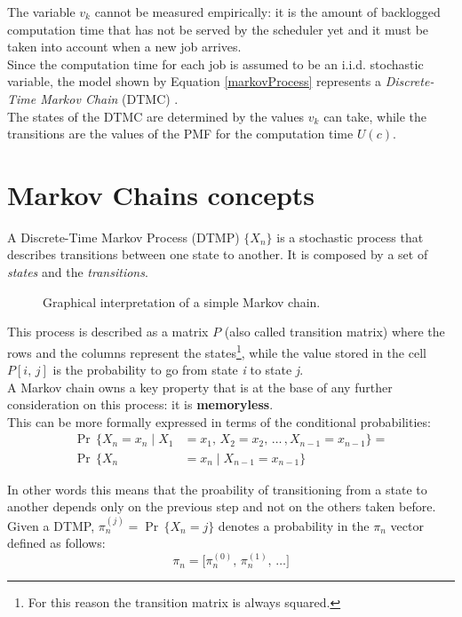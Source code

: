 The variable \( v_{k} \) cannot be measured empirically: it is the amount of backlogged computation time that has not be served by the scheduler yet and it must be taken into account when a new job arrives.\\
Since the computation time for each job is assumed to be an i.i.d. stochastic variable, the model shown by Equation \ref{markovProcess} represents a \emph{Discrete-Time Markov Chain} (DTMC) \cite{effRobustGuarantees} \cite{probGuarantees}.\\
The states of the DTMC are determined by the values \( v_{k} \) can take, while the transitions are the values of the PMF for the computation time \( U(c) \).

\section{Markov Chains concepts}
A Discrete-Time Markov Process (DTMP) \( \{X_{n}\} \) is a stochastic process that describes transitions between one state to another. It is composed by a set of \emph{states} and the \emph{transitions}.
\begin{figure}[H]
  \caption{Graphical interpretation of a simple Markov chain.}
  \label{automaton}
\end{figure}

This process is described as a matrix \( P \) (also called transition matrix) where the rows and the columns represent the states\footnote{For this reason the transition matrix is always squared.}, while the value stored in the cell \( P[i,\,j] \) is the probability to go from state \emph{i} to state \emph{j}.\\
A Markov chain owns a key property that is at the base of any further consideration on this process: it is \textbf{memoryless}.\\
This can be more formally expressed in terms of the conditional probabilities:
\begin{equation} \tag{3} \label{memoryless}
\begin{split}
  \Pr\,\{X_{n} = x_{n} \mid X_{1} &= x_{1},\,X_{2} = x_{2},\,\dots\,, X_{n-1} = x_{n-1} \} =\\
  \Pr\,\{X_{n} &= x_{n} \mid X_{n-1} = x_{n-1}  \}
\end{split}
\end{equation}

In other words this means that the proability of transitioning from a state to another depends only on the previous step and not on the others taken before.\\
Given a DTMP, \( \pi_{n}^{(j)} = \Pr\,\{X_{n} = j\}\) denotes a probability in the \( \pi_{n} \) vector defined as follows:
\begin{equation*}
  \pi_{n} =  \big[\pi_{n}^{(0)},\,\pi_{n}^{(1)},\,\dots \big]
\end{equation*}

